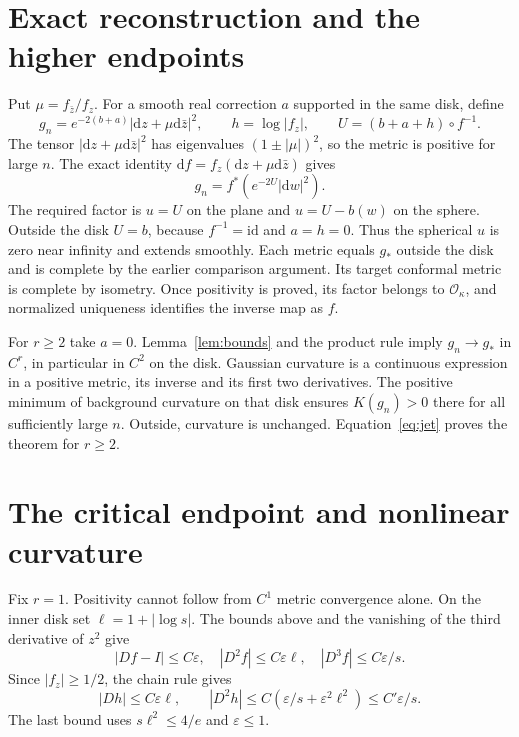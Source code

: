 \documentclass[11pt]{article}
\newcommand{\id}{\mathrm{id}}
\newcommand{\dd}{\mathrm d}
\begin{document}
\section{Exact reconstruction and the higher endpoints}
Put $\mu=f_{\bar z}/f_z$. For a smooth real correction $a$ supported in the same disk, define
\begin{equation}\label{eq:metric}
 g_n=e^{-2(b+a)}|\dd z+\mu\dd\bar z|^2,\qquad
 h=\log|f_z|,\qquad U=(b+a+h)\circ f^{-1}.
\end{equation}
The tensor $|\dd z+\mu\dd\bar z|^2$ has eigenvalues $(1\pm|\mu|)^2$, so the metric is positive for large $n$. The exact identity $\dd f=f_z(\dd z+\mu\dd\bar z)$ gives
\[
 g_n=f^*(e^{-2U}|\dd w|^2).
\]
The required factor is $u=U$ on the plane and $u=U-b(w)$ on the sphere. Outside the disk $U=b$, because $f^{-1}=\id$ and $a=h=0$. Thus the spherical $u$ is zero near infinity and extends smoothly. Each metric equals $g_*$ outside the disk and is complete by the earlier comparison argument. Its target conformal metric is complete by isometry. Once positivity is proved, its factor belongs to $\mathcal O_\kappa$, and normalized uniqueness identifies the inverse map as $f$.

For $r\geq2$ take $a=0$. Lemma~\ref{lem:bounds} and the product rule imply $g_n\to g_*$ in $C^r$, in particular in $C^2$ on the disk. Gaussian curvature is a continuous expression in a positive metric, its inverse and its first two derivatives. The positive minimum of background curvature on that disk ensures $K(g_n)>0$ there for all sufficiently large $n$. Outside, curvature is unchanged. Equation~\eqref{eq:jet} proves the theorem for $r\geq2$.

\section{The critical endpoint and nonlinear curvature}
Fix $r=1$. Positivity cannot follow from $C^1$ metric convergence alone. On the inner disk set $\ell=1+|\log s|$. The bounds above and the vanishing of the third derivative of $z^2$ give
\begin{equation}\label{eq:criticalbounds}
 |Df-I|\leq C\varepsilon,\quad |D^2f|\leq C\varepsilon\ell,
 \quad |D^3f|\leq C\varepsilon/s.
\end{equation}
Since $|f_z|\geq1/2$, the chain rule gives
\[
 |Dh|\leq C\varepsilon\ell,\qquad
 |D^2h|\leq C(\varepsilon/s+\varepsilon^2\ell^2)
 \leq C'\varepsilon/s.
\]
The last bound uses $s\ell^2\leq4/e$ and $\varepsilon\leq1$.
\end{document}
